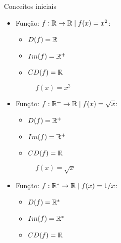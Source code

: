 \begin{frame}[allowframebreaks]{Conceitos iniciais}
\begin{itemize}
    \skipframe

    \item Função: $f:\mathbb{R} \rightarrow \mathbb{R} \mid f(x) = x^2$:
    \begin{itemize}
        \item $D(f) = \mathbb{R}$
        \item $Im(f) = \mathbb{R}^+$
        \item $CD(f) = \mathbb{R}$
    \end{itemize}

    \begin{figure}
        \centering
        \caption{$f(x) = x^2$}
    \end{figure}

    \skipframe

    \item Função: $f:\mathbb{R}^+ \rightarrow \mathbb{R} \mid f(x) = \sqrt{x}$:
    \begin{itemize}
        \item $D(f) = \mathbb{R}^+$
        \item $Im(f) = \mathbb{R}^+$
        \item $CD(f) = \mathbb{R}$
    \end{itemize}

    \begin{figure}
        \centering
        \caption{$f(x) = \sqrt{x}$}
    \end{figure}

    \skipframe

    \item Função: $f:\mathbb{R}^* \rightarrow \mathbb{R} \mid f(x) = 1/x$:
    \begin{itemize}
        \item $D(f) = \mathbb{R}^*$
        \item $Im(f) = \mathbb{R}^*$
        \item $CD(f) = \mathbb{R}$
    \end{itemize}


\end{itemize}
\end{frame}

